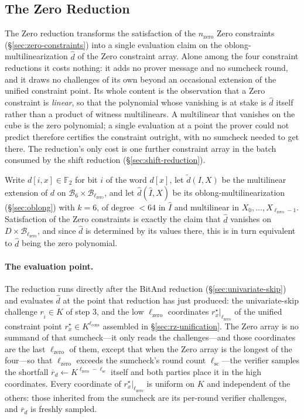 \documentclass{article}
\theoremstyle{definition}
\newcommand*{\mle}{\widetilde}
\newcommand{\BB}{\mathcal{B}}
\newcommand{\FF}[1]{\mathbb{F}_{#1}}
\begin{document}
\subsection{The Zero Reduction}
\label{sec:zero}

The Zero reduction transforms the satisfaction of the $n_\text{zero}$ Zero constraints (\S\ref{sec:zero-constraints}) into a single evaluation claim on the oblong-multilinearization $\widehat{d}$ of the Zero constraint array. Alone among the four constraint reductions it costs nothing: it adds no prover message and no sumcheck round, and it draws no challenges of its own beyond an occasional extension of the unified constraint point. Its whole content is the observation that a Zero constraint is \emph{linear}, so that the polynomial whose vanishing is at stake is $\widehat{d}$ itself rather than a product of witness multilinears. A multilinear that vanishes on the cube is the zero polynomial; a single evaluation at a point the prover could not predict therefore certifies the constraint outright, with no sumcheck needed to get there. The reduction's only cost is one further constraint array in the batch consumed by the shift reduction (\S\ref{sec:shift-reduction}).

Write $d[i, x] \in \FF{2}$ for bit $i$ of the word $d[x]$, let $\mle{d}(I, X)$ be the multilinear extension of $d$ on $\BB_6 \times \BB_{\ell_\text{zero}}$, and let $\widehat{d}(\widehat{I}, X)$ be its oblong-multilinearization (\S\ref{sec:oblong}) with $k = 6$, of degree $< 64$ in $\widehat{I}$ and multilinear in $X_0, \ldots, X_{\ell_\text{zero} - 1}$. Satisfaction of the Zero constraints is exactly the claim that $\widehat{d}$ vanishes on $D \times \BB_{\ell_\text{zero}}$, and since $\widehat{d}$ is determined by its values there, this is in turn equivalent to $\widehat{d}$ being the zero polynomial.

\paragraph{The evaluation point.}
The reduction runs directly after the BitAnd reduction (\S\ref{sec:univariate-skip}) and evaluates $\widehat{d}$ at the point that reduction has just produced: the univariate-skip challenge $r_{\widehat{i}} \in K$ of step 3, and the low $\ell_\text{zero}$ coordinates $r^\star_x|_{\ell_\text{zero}}$ of the unified constraint point $r^\star_x \in K^{\ell_\text{cons}}$ assembled in \S\ref{sec:rz-unification}. The Zero array is no summand of that sumcheck---it only reads the challenges---and those coordinates are the last $\ell_\text{zero}$ of them, except that when the Zero array is the longest of the four---so that $\ell_\text{zero}$ exceeds the sumcheck's round count $\ell_\text{sc}$---the verifier samples the shortfall $\overline{r}_d \gets K^{\ell_\text{zero} - \ell_\text{sc}}$ itself and both parties place it in the high coordinates. Every coordinate of $r^\star_x|_{\ell_\text{zero}}$ is uniform on $K$ and independent of the others: those inherited from the sumcheck are its per-round verifier challenges, and $\overline{r}_d$ is freshly sampled.
\end{document}
